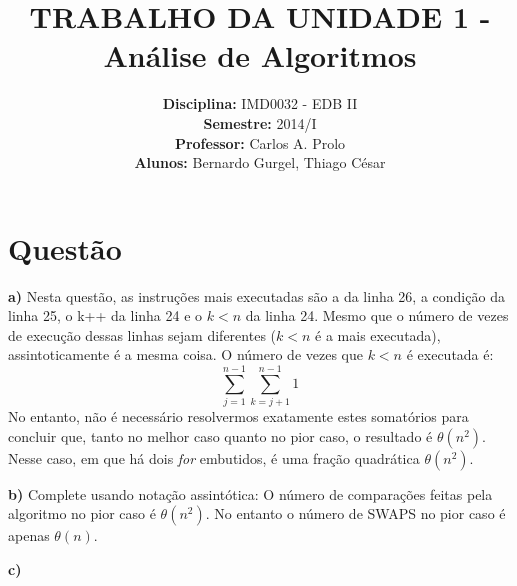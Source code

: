 \documentclass[a4paper,12pt]{article}
\title{TRABALHO DA UNIDADE 1 - Análise de Algoritmos}
\author{
\textbf{Disciplina:} IMD0032 - EDB II
\\\textbf{Semestre:} 2014/I
\\\textbf{Professor:} Carlos A. Prolo
\\\textbf{Alunos:} Bernardo Gurgel, Thiago César
}
\date{} %
\begin{document}
	
\maketitle
\section{Questão}
\begin{description}
    \item{\textbf{a)}} Nesta questão, as instruções mais executadas são a da linha 26, a condição da linha 25, o k++ da linha 24 e o $k < n$ da linha 24. Mesmo que o número de vezes de execução dessas linhas sejam diferentes ($k < n$ é a mais executada), assintoticamente é a mesma coisa. O número de vezes que $k < n$ é executada é:
	$$
	\sum_{j=1}^{n-1} \sum_{k=j+1}^{n-1} 1
	$$	
No entanto, não é necessário resolvermos exatamente estes somatórios para concluir que, tanto no melhor caso quanto no pior caso, o resultado é $\theta(n^2)$. Nesse caso, em que há dois \textit{for} embutidos, é uma fração quadrática $\theta(n^2)$.

	\item{\textbf{b)}} Complete usando notação assintótica: O número de comparações feitas pela algoritmo no pior caso é \underline{$\theta(n^2)$}. No entanto o número de SWAPS no pior caso é apenas \underline{$\theta(n)$}.
	\item{\textbf{c)}}
\end{description}

\end{document}

